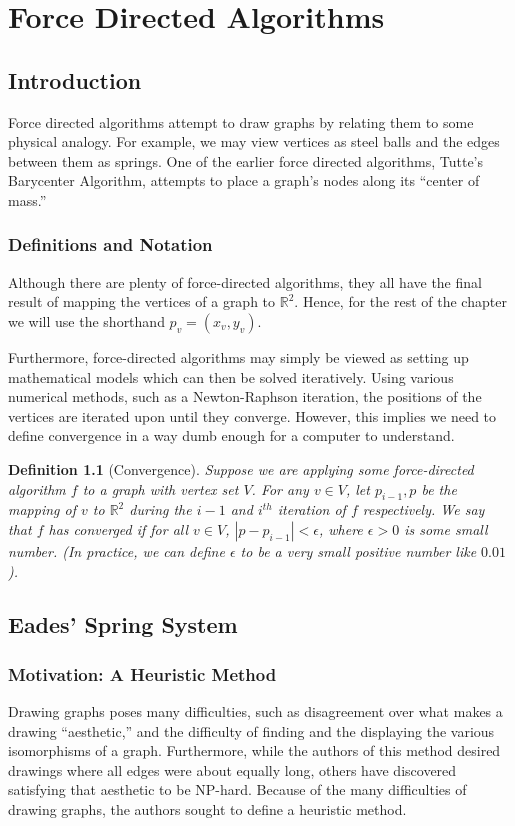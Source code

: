 \documentclass[11pt]{report}
\newcommand{\abs}[1]{\left|#1\right|}
\newtheorem{defn}{Definition}[section]
\begin{document}
\pagebreak

\chapter{Force Directed Algorithms}
\section{Introduction}
Force directed algorithms attempt to draw graphs by relating them to some physical analogy. For example, we may view vertices as steel balls and the edges between them as springs. One of the earlier force directed algorithms, Tutte's Barycenter Algorithm, attempts to place a graph's nodes along its ``center of mass.''

\subsection{Definitions and Notation}
Although there are plenty of force-directed algorithms, they all have the final result of mapping the vertices of a graph to $\mathbb{R}^2$. Hence, for the rest of the chapter we will use the shorthand $p_v = (x_v, y_v)$. 

\bigskip

Furthermore, force-directed algorithms may simply be viewed as setting up mathematical models which can then be solved iteratively. Using various numerical methods, such as a Newton-Raphson iteration, the positions of the vertices are iterated upon until they converge. However, this implies we need to define convergence in a way dumb enough for a computer to understand.

\begin{defn}[Convergence]
    Suppose we are applying some force-directed algorithm $f$ to a graph with vertex set $V$. For any $v \in V$, let $p_{i - 1}, p$ be the mapping of $v$ to $\mathbb{R}^2$ during the $i - 1$ and $i^{th}$ iteration of $f$ respectively. We say that $f$ has converged if for all $v \in V$, $\abs{p - p_{i - 1}} < \epsilon$, where $\epsilon > 0$ is some small number. (In practice, we can define $\epsilon$ to be a very small positive number like $0.01$).
\end{defn}

\section{Eades' Spring System}
\subsection{Motivation: A Heuristic Method}
Drawing graphs poses many difficulties, such as disagreement over what makes a drawing ``aesthetic,'' and the difficulty of finding and the displaying the various isomorphisms of a graph. Furthermore, while the authors of this method desired drawings where all edges were about equally long, others have discovered satisfying that aesthetic to be NP-hard. Because of the many difficulties of drawing graphs, the authors sought to define a heuristic method.
\end{document}
